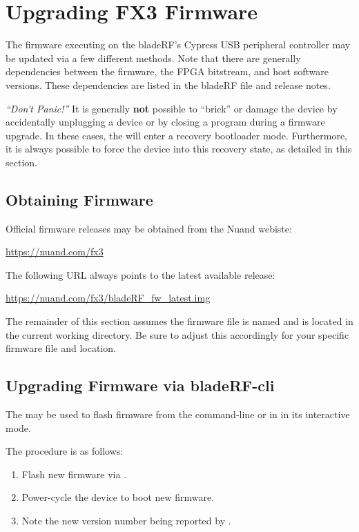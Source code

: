 \section{Upgrading FX3 Firmware} \label{sec:fw-upgrade}

The firmware executing on the bladeRF's Cypress  USB peripheral controller
may be updated via a few different methods. Note that there are generally
dependencies between the firmware, the FPGA bitstream, and host software
versions. These dependencies are listed in the bladeRF  file
and release notes.

\textit{``Don't Panic!''} It is generally \textbf{not} possible to ``brick'' or damage
the device by accidentally unplugging a device or by closing a program during a
firmware upgrade. In these cases, the  will enter a recovery bootloader
mode.  Furthermore, it is always possible to force the device into this
recovery state, as detailed in this section.

\subsection{Obtaining Firmware}
Official firmware releases may be obtained from the Nuand webiste: \\
\centerline{\url{https://nuand.com/fx3}}

The following URL always points to the latest available release: \\
\centerline{\url{https://nuand.com/fx3/bladeRF\_fw\_latest.img}}

The remainder of this section assumes the firmware file is named
 and is located in the current working directory.
Be sure to adjust this accordingly for your specific firmware file and location.

\subsection{Upgrading Firmware via bladeRF-cli}

The \bladerfcli may be used to flash firmware from the command-line 
or in in its interactive mode.

The procedure is as follows:
\begin{enumerate}
    \item Flash new firmware via \bladerfcli.
    \item Power-cycle the device to boot new firmware.
    \item Note the new version number being reported by \bladerfcli.
\end{enumerate}

